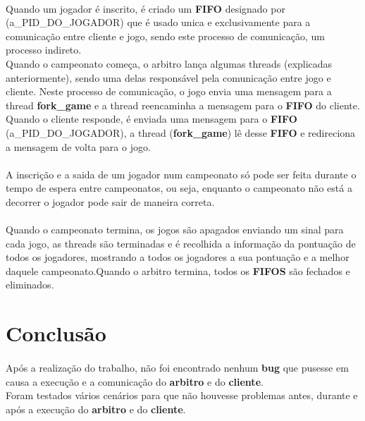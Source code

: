 \documentclass[letterpaper, 11pt]{article}
\begin{document}
\paragraph{}
Quando um jogador é inscrito, é criado um \textbf{FIFO} designado por (a\_PID\_DO\_JOGADOR) que é usado unica e exclusivamente para a comunicação entre cliente e jogo, sendo este processo de comunicação, um processo indireto.\\
Quando o campeonato começa, o arbitro lança algumas threads (explicadas anteriormente), sendo uma delas responsável pela comunicação entre jogo e cliente. Neste processo de comunicação, o jogo envia uma mensagem para a thread \textbf{fork\_game} e a thread reencaminha a mensagem para o \textbf{FIFO} do cliente. Quando o cliente responde, é enviada uma mensagem para o \textbf{FIFO} (a\_PID\_DO\_JOGADOR), a thread (\textbf{fork\_game}) lê desse \textbf{FIFO} e redireciona a mensagem de volta para o jogo.
\paragraph{}
A inscrição e a saida de um jogador num campeonato só pode ser feita durante o tempo de espera entre campeonatos, ou seja, enquanto o campeonato não está a decorrer o jogador pode sair de maneira correta.
\paragraph{}
Quando o campeonato termina, os jogos são apagados enviando um sinal para cada jogo, as threads são terminadas e é recolhida a informação da pontuação de todos os jogadores, mostrando a todos os jogadores a sua pontuação e a melhor daquele campeonato.Quando o arbitro termina, todos os \textbf{FIFOS} são fechados e eliminados.

\section{Conclusão}
\label{sec:org8ed05be}

\paragraph{}
Após a realização do trabalho, não foi encontrado nenhum \textbf{bug} que pusesse em causa a execução e a comunicação do \textbf{arbitro} e do \textbf{cliente}.\\
Foram testados vários cenários para que não houvesse problemas antes, durante e após a execução do \textbf{arbitro} e do \textbf{cliente}.
\end{document}
